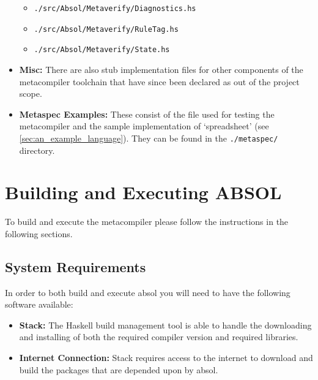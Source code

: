 \begin{itemize}
\begin{itemize}
        \item \texttt{./src/Absol/Metaverify/Diagnostics.hs}
        \item \texttt{./src/Absol/Metaverify/RuleTag.hs}
        \item \texttt{./src/Absol/Metaverify/State.hs}
    \end{itemize}
    \item \textbf{Misc:} There are also stub implementation files for other components of the metacompiler toolchain that have since been declared as out of the project scope. 
    \item \textbf{Metaspec Examples:} These consist of the file used for testing the metacompiler and the sample implementation of `spreadsheet' (see \autoref{sec:an_example_language}).
    They can be found in the \texttt{./metaspec/} directory.
\end{itemize}


\section{Building and Executing ABSOL} %
\label{sec:building_and_executing_absol}
To build and execute the metacompiler please follow the instructions in the following sections.

\subsection{System Requirements} %
\label{sub:system_requirements}
In order to both build and execute \gls{absol} you will need to have the following software available:
\begin{itemize}
    \item \textbf{Stack:} The Haskell build management tool is able to handle the downloading and installing of both the required compiler version and required libraries.
    \item \textbf{Internet Connection:} Stack requires access to the internet to download and build the packages that are depended upon by \gls{absol}. 
\end{itemize}


